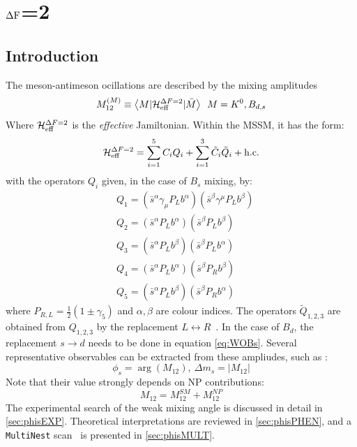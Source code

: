 \chapter{$\Delta \rm F$=2}
\label{sec:DF2}

\section{Introduction} %
The meson-antimeson ocillations are described by the mixing amplitudes~\cite{Altmannshofer:2009ne}
\begin{equation}
M_{12}^{(M)} \equiv \left \langle M | \mathcal{H}_{\rm eff}^{\Delta F = 2} | \bar{M} \right \rangle \ \, M = K^0, B_{d,s}
\end{equation}
Where $\mathcal{H}_{\rm eff}^{\Delta F = 2}$ is the \textit{effective} Jamiltonian. Within the MSSM, it has the form:
\begin{equation}
\mathcal{H}_{\rm eff}^{\Delta F = 2}  = \sum_{i=1}^{5}C_i Q_i + \sum_{i=1}^{3}\tilde{C}_i\tilde{Q}_i + \rm h.c.
\end{equation}
with the operators $Q_i$ given, in the case of $B_s$ mixing, by:
\begin{equation}
\begin{split}
& Q_1 = (\bar{s}^{\alpha}\gamma_{\mu}P_Lb^{\alpha})(\bar{s}^{\beta}\gamma^{\mu}P_Lb^{\beta}) \\
& Q_2 = (\bar{s}^{\alpha}P_Lb^{\alpha})(\bar{s}^{\beta}P_Lb^{\beta}) \\
& Q_3 = (\bar{s}^{\alpha}P_Lb^{\beta})(\bar{s}^{\beta}P_Lb^{\alpha}) \\
& Q_4 = (\bar{s}^{\alpha}P_Lb^{\alpha})(\bar{s}^{\beta}P_Rb^{\beta}) \\
& Q_5 = (\bar{s}^{\alpha}P_Lb^{\beta})(\bar{s}^{\beta}P_Rb^{\alpha})
\end{split}
\label{eq:WOBs}
\end{equation}
where $P_{R,L} = \frac{1}{2}(1 \pm \gamma_5)$ and $\alpha,\beta$ are colour indices. The operators $\tilde{Q}_{1,2,3}$ are obtained from $Q_{1,2,3}$ by the replacement $L \leftrightarrow R$~\cite{Altmannshofer:2009ne}. In the case of $B_d$, the replacement $s \rightarrow d$ needs to be done in equation \ref{eq:WOBs}. 
Several representative observables can be extracted from these ampliudes, such as  :
\begin{equation}
\phi_s = \arg{(M_{12})}, \ \Delta m_s = |M_{12}|
\end{equation}
Note that their value strongly depends on NP contributions:
\begin{equation}
M_{12} = M_{12}^{SM} + M_{12}^{NP} 
\end{equation}
The experimental search of the weak mixing angle is discussed in detail in \ref{sec:phisEXP}. Theoretical interpretations  are reviewed in \ref{sec:phisPHEN}, and a \texttt{MultiNest} scan~\cite{Feroz:2008xx} is presented in \ref{sec:phisMULT}. 


